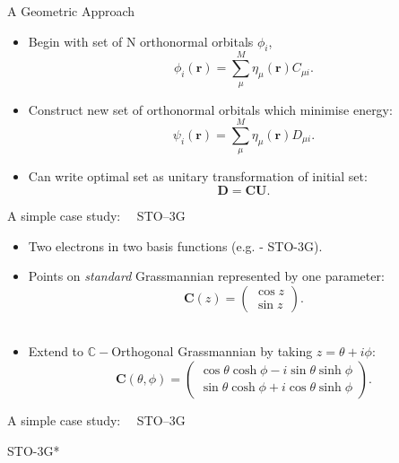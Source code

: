 \documentclass{beamer}
\begin{document}
\begin{frame}{A Geometric Approach}
\begin{itemize}
   \item<1-> Begin with set of N orthonormal orbitals ${ \phi_i }$,
  $$\phi_i(\mathbf{r})=\sum_\mu^M\eta_\mu(\mathbf{r}) C_{\mu i}.$$
   \item<2-> Construct new set of orthonormal orbitals which minimise energy:
  $$\psi_i(\mathbf{r})=\sum_\mu^M\eta_\mu(\mathbf{r}) D_{\mu i}.$$
   \item<3-> Can write optimal set as unitary transformation of initial set:
   $$\mathbf{D} = \mathbf{C} \mathbf{U}.$$
  \end{itemize}
 
\end{frame}

\begin{frame}{A simple case study: \ \ STO--3G}
\begin{itemize}
 \item<1->{Two electrons in two basis functions (e.g.  - STO-3G).\\ }
 \item<2->{Points on \textit{standard} Grassmannian represented by one parameter:
 $$ \mathbf{C}(z) = \left(
  \begin{matrix}
  \cos z \\  \sin z
  \end{matrix} \right). $$\\ }
 \item<3->{Extend to $\mathbb{C}-$Orthogonal Grassmannian by taking $z = \theta + i \phi$:\\ 
  $$ \mathbf{C}(\theta, \phi) = \left(
  \begin{matrix}
  \cos \theta \cosh \phi - i \sin \theta \sinh \phi \\  
  \sin \theta \cosh \phi  + i \cos \theta \sinh \phi
  \end{matrix} \right). $$}
 \end{itemize}
\end{frame}

\begin{frame}{A simple case study: \ \ STO--3G}


\end{frame}

\begin{frame}{ STO-3G*}
 \vspace{-1em}
 \begin{center}

 \end{center}
\end{frame} 
\end{document}
